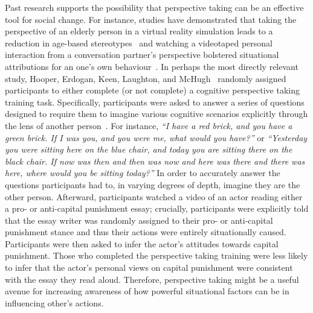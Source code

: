 \documentclass{sfuthesis}
\begin{document}
Past research supports the possibility that perspective taking can be an effective tool for social change. For instance, studies have demonstrated that taking the perspective of an elderly person in a virtual reality simulation leads to a reduction in age-based stereotypes~\cite{yee06} and watching a videotaped personal interaction from a conversation partner’s perspective bolstered situational attributions for an one’s own behaviour~\cite{storms73}. In perhaps the most directly relevant study, Hooper, Erdogan, Keen, Laughton, and McHugh~\cite{hooper15} randomly assigned participants to either complete (or not complete) a cognitive perspective taking training task. Specifically, participants were asked to answer a series of questions designed to require them to imagine various cognitive scenarios explicitly through the lens of another person~\cite{mchugh12}. For instance, \textit{“I have a red brick, and you have a green brick. If I was you, and you were me, what would you have?”} or \textit{“Yesterday you were sitting here on the blue chair, and today you are sitting there on the black chair. If now was then and then was now and here was there and there was here, where would you be sitting today?”} In order to accurately answer the questions participants had to, in varying degrees of depth, imagine they are the other person. Afterward, participants watched a video of an actor reading either a pro- or anti-capital punishment essay; crucially, participants were explicitly told that the essay writer was randomly assigned to their pro- or anti-capital punishment stance and thus their actions were entirely situationally caused. Participants were then asked to infer the actor’s attitudes towards capital punishment. Those who completed the perspective taking training were less likely to infer that the actor’s personal views on capital punishment were consistent with the essay they read aloud. Therefore, perspective taking might be a useful avenue for increasing awareness of how powerful situational factors can be in influencing other’s actions. 
\end{document}
